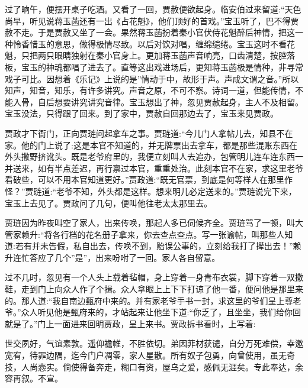 \begin{parag}
    过了晌午，便摆开桌子吃酒。又看了一回，贾赦便欲起身。临安伯过来留道:“天色尚早，听见说蒋玉菡还有一出《占花魁》，他们顶好的首戏。”宝玉听了，巴不得贾赦不走。于是贾赦又坐了一会。果然蒋玉菡扮着秦小官伏侍花魁醉后神情，把这一种怜香惜玉的意思，做得极情尽致。以后对饮对唱，缠绵缱绻。宝玉这时不看花魁，只把两只眼睛独射在秦小官身上。更加蒋玉菡声音响亮，口齿清楚，按腔落板，宝玉的神魂都唱了进去了。直等这出戏进场后，更知蒋玉菡极是情种，非寻常戏子可比。因想着《乐记》上说的是”情动于中，故形于声。声成文谓之音。”所以知声，知音，知乐，有许多讲究。声音之原，不可不察。诗词一道，但能传情，不能入骨，自后想要讲究讲究音律。宝玉想出了神，忽见贾赦起身，主人不及相留。宝玉没法，只得跟了回来。到了家中，贾赦自回那边去了，宝玉来见贾政。
\end{parag}


\begin{parag}
    贾政才下衙门，正向贾琏问起拿车之事。贾琏道:“今儿门人拿帖儿去，知县不在家。他的门上说了:这是本官不知道的，并无牌票出去拿车，都是那些混账东西在外头撒野挤讹头。既是老爷府里的，我便立刻叫人去追办，包管明儿连车连东西一并送来，如有半点差迟，再行禀过本官，重重处治。此刻本官不在家，求这里老爷看破些，可以不用本官知道更好。”贾政道:“既无官票，到底是何等样人在那里作怪？”贾琏道:“老爷不知，外头都是这样。想来明儿必定送来的。”贾琏说完下来，宝玉上去见了。贾政问了几句，便叫他往老太太那里去。
\end{parag}


\begin{parag}
    贾琏因为昨夜叫空了家人，出来传唤，那起人多已伺候齐全。贾琏骂了一顿，叫大管家赖升:“将各行档的花名册子拿来，你去查点查点。写一张谕帖，叫那些人知道:若有并未告假，私自出去，传唤不到，贻误公事的，立刻给我打了撵出去！”赖升连忙答应了几个”是”，出来吩咐了一回。家人各自留意。
\end{parag}


\begin{parag}
    过不几时，忽见有一个人头上载着毡帽，身上穿着一身青布衣裳，脚下穿着一双撒鞋，走到门上向众人作了个揖。众人拿眼上上下下打谅了他一番，便问他是那里来的。那人道:“我自南边甄府中来的。并有家老爷手书一封，求这里的爷们呈上尊老爷。”众人听见他是甄府来的，才站起来让他坐下道:“你乏了，且坐坐，我们给你回就是了。”门上一面进来回明贾政，呈上来书。贾政拆书看时，上写着:
\end{parag}


\begin{qute2sp}
    世交夙好，气谊素敦。遥仰襜帷，不胜依切。弟因菲材获谴，自分万死难偿，幸邀宽宥，待罪边隅，迄今门户凋零，家人星散。所有奴子包勇，向曾使用，虽无奇技，人尚悫实。倘使得备奔走，糊口有资，屋乌之爱，感佩无涯矣。专此奉达，余容再叙。不宣。
\end{qute2sp}


